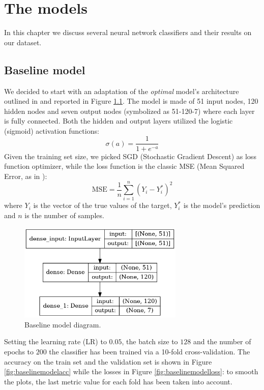 \chapter{The models}
In this chapter we discuss several neural network classifiers and their results on our dataset.
\section{Baseline model}
We decided to start with an adaptation of the \textit{optimal} model's architecture outlined in \cite{blackardDean} and reported in Figure \ref{fig:baselinemodel}. The model is made of 51 input nodes, 120 hidden nodes and seven output nodes (symbolized as 51-120-7) where each layer is fully connected. Both the hidden and output layers utilized the logistic (sigmoid) activation functions:
$$
\sigma(a) = \frac{1}{1 + e^{-a}}
$$
Given the training set size, we picked SGD (Stochastic Gradient Descent) as loss function optimizer, while the loss function is the classic MSE (Mean Squared Error, as in \cite{blackardDean}):
\begin{equation}
\text{MSE} = \frac{1}{n}\sum_{i=1}^{n}(Y_i - Y^{*}_{i})^2
\end{equation}
where $Y_i$ is the vector of the true values of the target, $Y^{*}_{i}$ is the model's prediction and $n$ is the number of samples.
\begin{figure}
\centering
\includegraphics[width=0.7\textwidth]{./TeX_files/img/baselinemodel.png}
\caption{Baseline model diagram.}
\label{fig:baselinemodel}
\end{figure}
Setting the learning rate (LR) to $0.05$, the batch size to $128$ and the number of epochs to $200$ the classifier has been trained via a 10-fold cross-validation. The accuracy on the train set and the validation set is shown in Figure \ref{fig:baselinemodelacc} while the losses in Figure \ref{fig:baselinemodelloss}: to smooth the plots, the last metric value for each fold has been taken into account.
